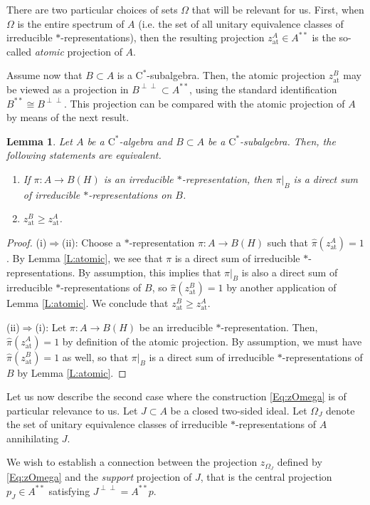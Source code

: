 \documentclass[10pt]{amsart}
\newcommand{\rC}{\mathrm{C}}
\newcommand{\at}{\operatorname{at}}
\newtheorem{lemma}{Lemma}[section]
\theoremstyle{definition}
\begin{document}
There are two particular choices of sets $\Omega$ that will be relevant for us. First, when $\Omega$ is the entire spectrum of $A$ (i.e. the set of all unitary equivalence classes of irreducible $*$-representations), then the resulting projection $z^A_{\at}\in A^{**}$ is the so-called \emph{atomic} projection of $A$. 

Assume now that $B\subset A$ is a $\rC^*$-subalgebra. Then, the atomic projection $z_{\at}^B$ may be viewed as a projection in $B^{\perp\perp}\subset A^{**}$, using the standard identification $B^{**}\cong B^{\perp\perp}$. This projection can be compared with the atomic projection of $A$ by means of the next result.

\begin{lemma}\label{L:atcomp}
Let $A$ be a $\rC^*$-algebra and $B\subset A$ be a $\rC^*$-subalgebra. Then, the following statements are equivalent. 
\begin{enumerate}[{\rm (i)}]
\item If $\pi:A\to B(H)$ is an irreducible $*$-representation, then $\pi|_{B}$ is a direct sum of irreducible $*$-representations on $B$.
\item $z_{\at}^B\geq z^A_{\at}$.
\end{enumerate}
\end{lemma}
\begin{proof}
(i)$\Rightarrow$(ii): Choose a $*$-representation   $\pi:A\to B(H)$  such that $\widehat \pi(z_{\at}^A)=1$. By Lemma \ref{L:atomic}, we see that $\pi$ is a direct sum of irreducible $*$-representations. By assumption, this implies that $\pi|_B$ is also a direct sum of irreducible $*$-representations of $B$, so $\widehat\pi(z^B_{\at})=1$ by another application of Lemma \ref{L:atomic}. We conclude that $z_{\at}^B\geq z^A_{\at}$.

(ii)$\Rightarrow$(i):  Let $\pi:A\to B(H)$ be an irreducible $*$-representation. Then, $\widehat\pi(z_{\at}^A)=1$ by definition of the atomic projection. By assumption, we must have $\widehat\pi(z_{\at}^B)=1$ as well, so that $\pi|_B$ is a direct sum of irreducible $*$-representations of $B$ by Lemma \ref{L:atomic}.
\end{proof}

Let us now describe the second case where the construction \eqref{Eq:zOmega} is of particular relevance to us. Let $J\subset A$ be a closed two-sided ideal. Let $\Omega_J$ denote the set of unitary equivalence classes of irreducible $*$-representations of $A$ annihilating $J$. 

We wish to establish a connection between the projection $z_{\Omega_J}$ defined by \eqref{Eq:zOmega} and the \emph{support} projection of $J$, that is the central projection $p_J\in A^{**}$ satisfying $J^{\perp\perp}=A^{**}p$.
\end{document}
